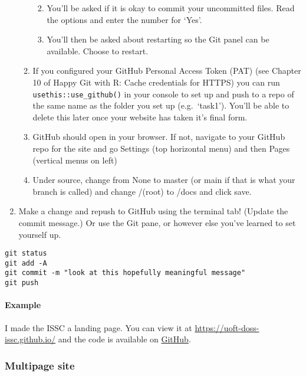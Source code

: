 \documentclass[
]{article}
\begin{document}
\begin{enumerate}
\begin{enumerate}
    \begin{enumerate}
    \def\labelenumiii{\arabic{enumiii}.}
    \item
      You'll be asked if it is okay to commit your uncommitted files. Read the options and enter the number for `Yes'.
    \item
      You'll then be asked about restarting so the Git panel can be available. Choose to restart.
    \end{enumerate}
  \item
    If you configured your GitHub Personal Access Token (PAT) (see Chapter 10 of Happy Git with R: Cache credentials for HTTPS) you can run \texttt{usethis::use\_github()} in your console to set up and push to a repo of the same name as the folder you set up (e.g.~`task1'). You'll be able to delete this later once your website has taken it's final form.
  \item
    GitHub should open in your browser. If not, navigate to your GitHub repo for the site and go Settings (top horizontal menu) and then Pages (vertical menus on left)
  \item
    Under source, change from None to master (or main if that is what your branch is called) and change /(root) to /docs and click save.
  \end{enumerate}
\item
  Make a change and repush to GitHub using the terminal tab! (Update the commit message.) Or use the Git pane, or however else you've learned to set yourself up.
\end{enumerate}

\begin{verbatim}
git status
git add -A
git commit -m "look at this hopefully meaningful message"
git push
\end{verbatim}

\hypertarget{example}{%
\paragraph{Example}\label{example}}

I made the ISSC a landing page. You can view it at \url{https://uoft-doss-issc.github.io/} and the code is available on \href{https://github.com/UofT-DoSS-ISSC/UofT-DoSS-ISSC.github.io}{GitHub}.

\hypertarget{multipage-site}{%
\subsubsection{Multipage site}\label{multipage-site}}
\end{document}
